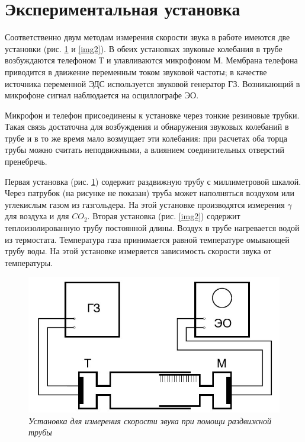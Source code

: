 \documentclass{article}
\begin{document}
\section*{Экспериментальная установка}

Соответственно двум методам измерения скорости звука в работе имеются две установки (рис. \ref{img1} и \ref{img2}). В обеих установках звуковые колебания в трубе возбуждаются телефоном Т и улавливаются микрофоном М. Мембрана телефона приводится в движение переменным током звуковой частоты; в качестве источника переменной ЭДС используется звуковой генератор ГЗ. Возникающий в микрофоне сигнал наблюдается на осциллографе ЭО.

Микрофон и телефон присоединены к установке через тонкие резиновые трубки. Такая связь достаточна для возбуждения и обнаружения звуковых колебаний в трубе и в то же время мало возмущает эти колебания: при расчетах оба торца трубы можно считать неподвижными, а влиянием соединительных отверстий пренебречь.

Первая установка (рис. \ref{img1}) содержит раздвижную трубу с миллиметровой шкалой. Через патрубок (на рисунке не показан) труба может наполняться воздухом или углекислым газом из газгольдера. На этой установке производятся измерения $ \gamma $ для воздуха и для $ CO_2 $. Вторая установка (рис. \ref{img2}) содержит теплоизолированную трубу постоянной длины. Воздух в трубе нагревается водой из термостата. Температура газа принимается равной температуре омывающей трубу воды. На этой установке измеряется зависимость скорости звука от температуры.

\begin{figure}[h!]
	\begin{center}
		\includegraphics[width=12cm]{ust1.jpg}
	\end{center}
	\caption{\textit{Установка для измерения скорости звука при помощи раздвижной трубы}}
	\label{img1}
\end{figure}
\end{document}
